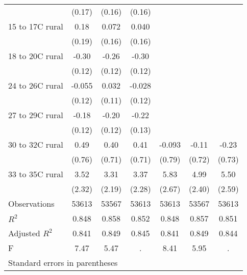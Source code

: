 \documentclass[paper=letterpaper, fontsize=11pt]{article} %
\begin{document}
\begin{longtable}{l*{6}{c}}
                    &      (0.17)&      (0.16)&      (0.16)&            &            &            \\
15 to 17C rural     &        0.18&       0.072&       0.040&            &            &            \\
                    &      (0.19)&      (0.16)&      (0.16)&            &            &            \\
18 to 20C rural     &       -0.30&       -0.26&       -0.30&            &            &            \\
                    &      (0.12)&      (0.12)&      (0.12)&            &            &            \\
24 to 26C rural     &      -0.055&       0.032&      -0.028&            &            &            \\
                    &      (0.12)&      (0.11)&      (0.12)&            &            &            \\
27 to 29C rural     &       -0.18&       -0.20&       -0.22&            &            &            \\
                    &      (0.12)&      (0.12)&      (0.13)&            &            &            \\
30 to 32C rural     &        0.49&        0.40&        0.41&      -0.093&       -0.11&       -0.23\\
                    &      (0.76)&      (0.71)&      (0.71)&      (0.79)&      (0.72)&      (0.73)\\
33 to 35C rural     &        3.52&        3.31&        3.37&        5.83&        4.99&        5.50\\
                    &      (2.32)&      (2.19)&      (2.28)&      (2.67)&      (2.40)&      (2.59)\\
\hline
Observations        &       53613&       53567&       53613&       53613&       53567&       53613\\
\(R^{2}\)           &       0.848&       0.858&       0.852&       0.848&       0.857&       0.851\\
Adjusted \(R^{2}\)  &       0.841&       0.849&       0.845&       0.841&       0.849&       0.844\\
F                   &        7.47&        5.47&           .&        8.41&        5.95&           .\\
\hline\hline
\multicolumn{7}{l}{\footnotesize Standard errors in parentheses}\\
\end{longtable}
\end{document}
